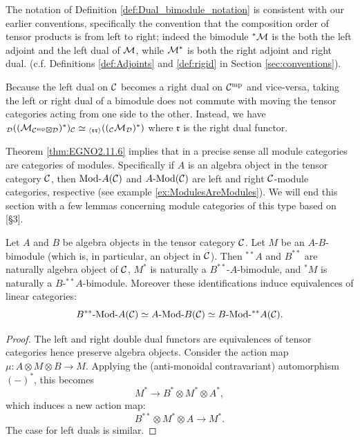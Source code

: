 \documentclass{amsart}
\begin{document}
\begin{remark}
	The notation of Definition \ref{def:Dual_bimodule_notation} is consistent with our earlier conventions, specifically the convention that the composition order of tensor products is from left to right; indeed the bimodule ${}^*\mathcal M$ is the both the left adjoint and the left dual of $\mathcal M$, while $\mathcal M^*$ is both the right adjoint and right dual. (c.f. Definitions \ref{def:Adjoints} and \ref{def:rigid} in Section \ref{sec:conventions}). 
\end{remark}

\begin{warning} \label{warning:DualTwist}
Because the left dual on $\mathcal C$ becomes a right dual on $\mathcal C^{\mathrm{mp}}$ and vice-versa, taking the left or right dual of a bimodule does not commute with moving the tensor categories acting from one side to the other.  Instead, we have ${}_\mathcal D ((\mathcal M_{\mathcal C^{\mathrm{mp}} \boxtimes \mathcal D})^*)_\mathcal C \simeq {}_{\langle \mathfrak{r r} \rangle}(({}_\mathcal C \mathcal M_\mathcal D)^*)$ where $\mathfrak{r}$ is the right dual functor.%
\end{warning}

Theorem \ref{thm:EGNO2.11.6} implies that in a precise sense all module categories are categories of modules. Specifically if $A$ is an algebra object in the tensor category $\mathcal C$, then $\Mod{}{A}(\cC)$ and $\Mod{A}{}(\cC)$ are left and right $\mathcal C$-module categories, respective (see example \ref{ex:ModulesAreModules}). We will end this section with a few lemmas concerning module categories of this type based on \cite{MR2097289}[\S 3].

\begin{lemma} \label{lem:dualing-amod}
	Let $A$ and $B$ be algebra objects in the tensor category $\mathcal C$. Let $M$ be an $A$-$B$-bimodule (which is, in particular, an object in $\mathcal C$). Then ${}^{**}A$ and $B^{**}$ are naturally algebra object of $\mathcal C$, $M^*$ is naturally a $B^{**}$-$A$-bimodule, and ${}^*M$ is naturally a $B$-${}^{**}A$-bimodule. Moreover these identifications induce equivalences of linear categories:
	\begin{equation*}
		\Mod{B^{**}}{A}(\cC) \simeq \Mod{A}{B}(\cC) \simeq \Mod{B}{{}^{**}A}(\cC).
	\end{equation*}
\end{lemma}

\begin{proof}
	The left and right double dual functors are equivalences of tensor categories hence preserve algebra objects. Consider the action map $\mu:A \otimes M \otimes B \to M$. Applying the (anti-monoidal contravariant) automorphism $(-)^*$, this becomes
	\begin{equation*}
		M^* \to B^* \otimes M^* \otimes A^*,
	\end{equation*}
	which induces a new action map:
	\begin{equation*}
		B^{**} \otimes M^* \otimes A \to M^*.
	\end{equation*}
	The case for left duals is similar. 
\end{proof}
\end{document}
